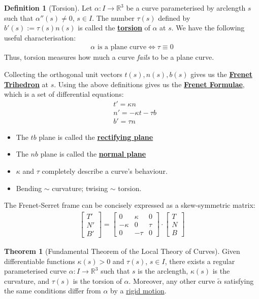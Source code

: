 \documentclass[11pt]{scrartcl}
\newcommand{\R}[0]{\mathbb{R}}
\theoremstyle{definition}
\newtheorem{theorem}{Theorem}
\newtheorem{definition}{Definition}
\theoremstyle{remark}
\newcommand{\dfn}[1]{\textbf{\underline{#1}}}
\begin{document}
{\begin{definition}[Torsion]
	Let $\alpha: I \rightarrow \R^3$ be a curve parameterised by arclength $s$ such that $\alpha''(s) \neq 0$, $s \in I$. The number $\tau(s)$ defined by $b'(s) := \tau(s)  n(s)$ is called the \dfn{torsion} of $\alpha$ at $s$. We have the following useful characterisation: 
	\begin{align*}
		\alpha \text{ is a plane curve} \iff \tau \equiv 0
	\end{align*}
	Thus, torsion measures how much a curve \emph{fails} to be a plane curve. 
\end{definition}

Collecting the orthogonal unit vectors $t(s), n(s), b(s)$ gives us the \dfn{Frenet Trihedron} at $s$. Using the above definitions gives us the \dfn{Frenet Formulae}, which is a set of differential equations: 
\begin{align}
	& t' = \kappa n \\
	& n' = - \kappa t - \tau b \\
	& b' = \tau n 	
\end{align}
\begin{itemize}[noitemsep]
	\item The $tb$ plane is called the \dfn{rectifying plane} 
	\item The $nb$ plane is called the \dfn{normal plane} 
	\item $\kappa$ and $\tau$ completely describe a curve's behaviour. 
	\item Bending $\sim$ curvature; twising $\sim$ torsion. 
\end{itemize}
The Frenet-Serret frame can be concisely expressed as a skew-symmetric matrix: 
\begin{align}
	\begin{bmatrix}
		T' \\
		N ' \\
		B' 
	\end{bmatrix}	 = \begin{bmatrix}
		0 & \kappa & 0 \\
		- \kappa & 0 & \tau \\
		0 & - \tau & 0 
	\end{bmatrix} \cdot \begin{bmatrix}
		T \\
		N \\
		B
	\end{bmatrix}
\end{align}

\begin{theorem}[Fundamental Theorem of the Local Theory of Curves]
	Given differentiable functions  $\kappa(s) > 0$ and $\tau(s)$, $s \in I$, there exists a regular parameterised curve $\alpha: I \rightarrow \R^3$ such that $s$ is the arclength, $\kappa(s)$ is the curvature, and $\tau(s)$ is the torsion of $\alpha$. Moreover, any other curve $\widetilde{\alpha}$ satisfying the same conditions differ from $\alpha$ by a \underline{rigid motion}. 
\end{theorem}

}
\end{document}
